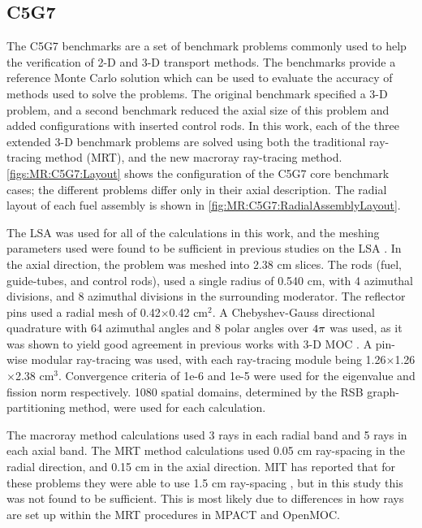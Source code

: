 {{    \subsection{C5G7}{\label{ssec:MR:C5G7}
      The C5G7 \cite{Smith2002,Smith2006} benchmarks are a set of benchmark problems commonly used to help the verification of 2-D and 3-D transport methods.
      The benchmarks provide a reference Monte Carlo solution which can be used to evaluate the accuracy of methods used to solve the problems.
      The original benchmark specified a 3-D problem, and a second benchmark reduced the axial size of this problem and added configurations with inserted control rods.
      In this work, each of the three extended 3-D benchmark problems are solved using both the traditional ray-tracing method (\ac{MRT}), and the new macroray ray-tracing method.
      \cref{figs:MR:C5G7:Layout} shows the configuration of the C5G7 core benchmark cases; the different problems differ only in their axial description.
      The radial layout of each fuel assembly is shown in \cref{fig:MR:C5G7:RadialAssemblyLayout}.

      The \ac{LSA} was used for all of the calculations in this work, and the meshing parameters used were found to be sufficient in previous studies on the \ac{LSA} \cite{Gunow2016}.
      In the axial direction, the problem was meshed into 2.38 cm slices.
      The rods (fuel, guide-tubes, and control rods), used a single radius of 0.540 cm, with 4 azimuthal divisions, and 8 azimuthal divisions in the surrounding moderator.
      The reflector pins used a radial mesh of 0.42$\times$0.42 cm$^2$.
      A Chebyshev-Gauss directional quadrature with 64 azimuthal angles and 8 polar angles over $4\pi$ was used, as it was shown to yield good agreement in previous works with 3-D \ac{MOC} \cite{Kochunas2013}.
      A pin-wise modular ray-tracing was used, with each ray-tracing module being 1.26$\times$1.26$\times$2.38 cm$^3$.
      Convergence criteria of 1e-6 and 1e-5 were used for the eigenvalue and fission norm respectively.
      1080 spatial domains, determined by the \ac{RSB} graph-partitioning method, were used for each calculation.

      The macroray method calculations used 3 rays in each radial band and 5 rays in each axial band.
      The \ac{MRT} method calculations used 0.05 cm ray-spacing in the radial direction, and 0.15 cm in the axial direction.
      \ac{MIT} has reported that for these problems they were able to use 1.5 cm ray-spacing \cite{Gunow2016}, but in this study this was not found to be sufficient.
      This is most likely due to differences in how rays are set up within the \ac{MRT} procedures in MPACT and OpenMOC.

}}}
